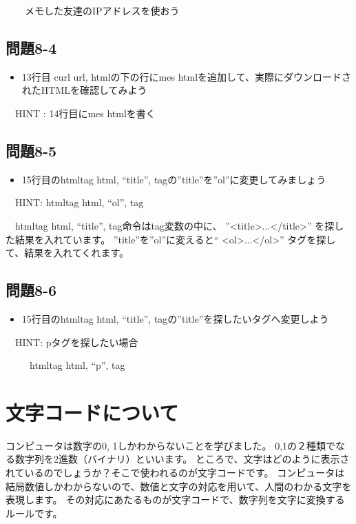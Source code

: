 \documentclass[a4paper,12pt,dvipdfmx]{jarticle}
\begin{document}
\ \ \ \ メモした友達のIPアドレスを使おう

\subsection*{問題8-4}
\begin{itemize}
\item 13行目 curl url, htmlの下の行にmes
htmlを追加して、実際にダウンロードされたHTMLを確認してみよう
\end{itemize}
\ \ HINT : 14行目にmes htmlを書く

\subsection*{問題8-5}
\begin{itemize}
\item 15行目のhtmltag html, “title”,
tagの”title”を”ol”に変更してみましょう
\end{itemize}
\ \ HINT: htmltag html, “ol”, tag

\ \ htmltag html, “title”,
tag命令はtag変数の中に、
”{\textless}title{\textgreater}...{\textless}/title{\textgreater}”
を探した結果を入れています。
”title”を”ol”に変えると“
{\textless}ol{\textgreater}...{\textless}/ol{\textgreater}”
タグを探して、結果を入れてくれます。


\subsection*{問題8-6}
\begin{itemize}
\item 15行目のhtmltag html, “title”,
tagの”title”を探したいタグへ変更しよう
\end{itemize}
\ \ HINT: pタグを探したい場合

\ \ \ \ \ htmltag html, “p”, tag


\bigskip

\clearpage\section{文字コードについて}
コンピュータは数字の0,
1しかわからないことを学びました。
0,1の２種類でなる数字列を2進数（バイナリ）といいます。
ところで、文字はどのように表示されているのでしょうか？そこで使われるのが文字コードです。
コンピュータは結局数値しかわからないので、数値と文字の対応を用いて、人間のわかる文字を表現します。
その対応にあたるものが文字コードで、数字列を文字に変換するルールです。
\end{document}
